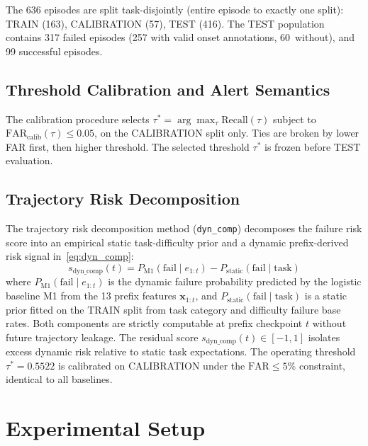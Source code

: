 \documentclass[conference,letterpaper]{IEEEtran}
\begin{document}
The 636 episodes are split task-disjointly (entire episode to exactly
one split): TRAIN (163), CALIBRATION (57), TEST (416). The TEST
population contains 317 failed episodes (257 with valid onset
annotations, 60~without), and 99 successful episodes.

\subsection{Threshold Calibration and Alert Semantics}

The calibration procedure selects
$\tau^* = \arg\max_\tau \mathrm{Recall}(\tau)$ subject to
$\mathrm{FAR}_{\mathrm{calib}}(\tau) \leq 0.05$, on the CALIBRATION
split only. Ties are broken by lower FAR first, then higher threshold.
The selected threshold $\tau^*$ is frozen before TEST evaluation.

\subsection{Trajectory Risk Decomposition}

The trajectory risk decomposition method (\texttt{dyn\_comp}) decomposes
the failure risk score into an empirical static task-difficulty prior
and a dynamic prefix-derived risk signal in~\eqref{eq:dyn_comp}:
\begin{equation}
s_{\mathrm{dyn\_comp}}(t) = P_{\mathrm{M1}}(\mathrm{fail} \mid e_{1:t}) - P_{\mathrm{static}}(\mathrm{fail} \mid \mathrm{task})
\label{eq:dyn_comp}
\end{equation}
where $P_{\mathrm{M1}}(\mathrm{fail} \mid e_{1:t})$ is the dynamic
failure probability predicted by the logistic baseline M1 from the 13
prefix features $\mathbf{x}_{1:t}$, and
$P_{\mathrm{static}}(\mathrm{fail} \mid \mathrm{task})$ is a static prior
fitted on the TRAIN split from task category and difficulty failure base
rates. Both components are strictly computable at prefix checkpoint $t$
without future trajectory leakage. The residual score
$s_{\mathrm{dyn\_comp}}(t) \in [-1, 1]$ isolates excess dynamic risk
relative to static task expectations. The operating threshold
$\tau^* = 0.5522$ is calibrated on CALIBRATION under the
$\mathrm{FAR} \leq 5\%$ constraint, identical to all baselines.

\section{Experimental Setup}
\end{document}

